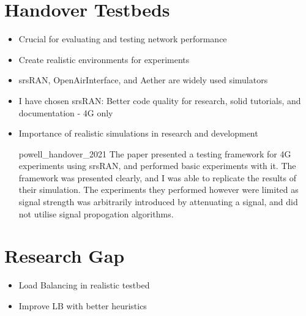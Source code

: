 \section{Handover Testbeds}
\begin{itemize}
  \item Crucial for evaluating and testing network performance
  \item Create realistic environments for experiments
  \item srsRAN, OpenAirInterface, and Aether are widely used simulators
  \item I have chosen srsRAN: Better code quality for research, solid tutorials, and documentation - 4G only
  \item Importance of realistic simulations in research and development
    \item[{powell_handover_2021}] The paper presented a testing framework for 4G experiments using srsRAN, and performed basic experiments with it. The framework was presented clearly, and I was able to replicate the results of their simulation. The experiments they performed however were limited as signal strength was arbitrarily introduced by attenuating a signal, and did not utilise signal propogation algorithms.
\end{itemize}


\section{Research Gap}
\begin{itemize}
    \item Load Balancing in realistic testbed
    \item Improve LB with better heuristics
\end{itemize}